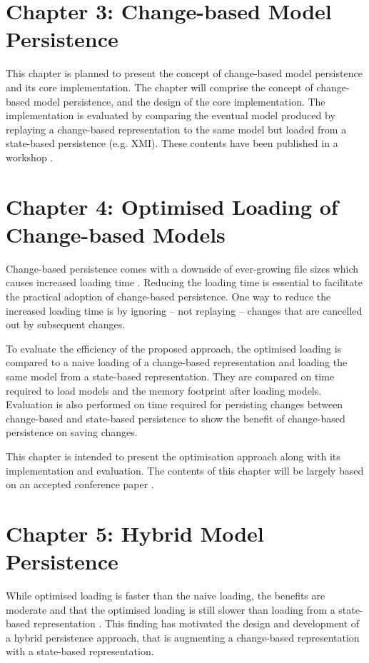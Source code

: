 \section{Chapter 3: Change-based Model Persistence}
\label{sec:chapter_3_Change-based_model_ersistence_plan}
This chapter is planned to present the concept of change-based model persistence and its core implementation. The chapter will comprise the concept of change-based model persistence, and the design of the core implementation. The implementation is evaluated by comparing the eventual model produced by replaying a change-based representation to the same model but loaded from a state-based persistence (e.g. XMI). These contents have been published in a workshop \cite{DBLP:conf/models/YohannisKP17}.


\section{Chapter 4: Optimised Loading of Change-based Models}
\label{sec:chapter_4_optimised_loading_change_based_model_persistence}

Change-based persistence comes with a downside of ever-growing file sizes \cite{DBLP:journals/entcs/RobbesL07,DBLP:conf/edoc/KoegelHLHD10} which causes increased loading time \cite{mens2002state}. Reducing the loading time is essential to facilitate the practical adoption of change-based persistence. One way to reduce the increased loading time is by ignoring -- not replaying -- changes that are cancelled out by subsequent changes. 

To evaluate the efficiency of the proposed approach, the optimised loading is compared to a naive loading of a change-based representation and loading the same model from a state-based representation. They are compared on time required to load models and the memory footprint after loading models. Evaluation is also performed on time required for persisting changes between change-based and state-based persistence to show the benefit of change-based persistence on saving changes. 

This chapter is intended to present the optimisation approach along with its implementation and evaluation. The contents of this chapter will be largely based on an accepted conference paper \cite{yohannis2018towards}. 


\section{Chapter 5: Hybrid Model Persistence}
\label{sec:chapter_5_hybrid_model_persistence}
While optimised loading is faster than the naive loading, the benefits are moderate and that the optimised loading is still slower than loading from a state-based representation \cite{yohannis2018towards}. This finding has motivated the design and development of a hybrid persistence approach, that is augmenting a change-based representation with a state-based representation. 

